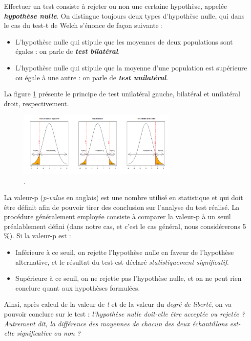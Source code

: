\documentclass[10pt, oneside, a4paper]{article}
\begin{document}
Effectuer un test consiste à rejeter ou non une certaine hypothèse, appelée \textbf{\textit{hypothèse nulle}}. On distingue toujours deux types d'hypothèse nulle, qui dans le cas du test-t de Welch s'énonce de façon suivante :
\begin{itemize}
\item L'hypothèse nulle qui stipule que les moyennes de deux populations sont égales : on parle de \textbf{\textit{test bilatéral}}.
\item L'hypothèse nulle qui stipule que la moyenne d'une population est supérieure ou égale à une autre : on parle de \textbf{\textit{test unilatéral}}. \\
\end{itemize}
La figure \ref{fig:bi_uni} présente le principe de test unilatéral gauche, bilatéral et unilatéral droit, respectivement.
\begin{figure}[htbp]
    \centering
    \includegraphics[width=0.7\textwidth]{image/bi_uni}    
    \caption{.}    
    \label{fig:bi_uni}
\end{figure}

La valeur-p (\textit{p-value} en anglais) est une nombre utilisé en statistique et qui doit être définit afin de pouvoir tirer des conclusion sur l'analyse du test réalisé. La procédure généralement employée consiste à comparer la valeur-p à un seuil préalablement défini (dans notre cas, et c'est le cas général, nous considérerons 5 \%). Si la valeur-p est :
\begin{itemize}
\item Inférieure à ce seuil, on rejette l'hypothèse nulle en faveur de l’hypothèse alternative, et le résultat du test est déclaré \textit{statistiquement significatif}.
\item Supérieure à ce seuil, on ne rejette pas l’hypothèse nulle, et on ne peut rien conclure quant aux hypothèses formulées. \\
\end{itemize}

Ainsi, après calcul de la valeur de \textit{t} et de la valeur du \textit{degré de liberté}, on va pouvoir conclure sur le test : \textit{l'hypothèse nulle doit-elle être acceptée ou rejetée ? Autrement dit, la différence des moyennes de chacun des deux échantillons est-elle significative ou non ?}
\end{document}
